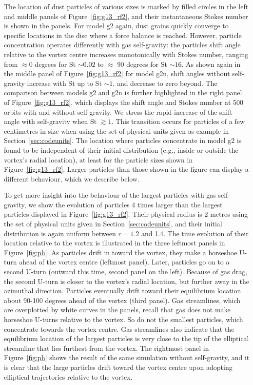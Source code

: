 \documentclass[a4paper,usenatbib]{mnras}
\begin{document}
The location of dust particles of various sizes is marked by filled
circles in the left and middle panels of Figure~\ref{fig:g13_rf2}, and
their instantaneous Stokes number is shown in the panels. For model g2
again, dust grains quickly converge to specific locations in the disc
where a force balance is reached. However, particle concentration
operates differently with gas self-gravity: the particles shift angle
relative to the vortex centre increases monotonically with Stokes
number, ranging from $\approx 0$ degrees for St $\sim 0.02$ to
$\approx$ 90 degrees for St $\sim 16$. As shown again in the middle
panel of Figure~\ref{fig:g13_rf2} for model g2n, shift angles without
self-gravity increase with St up to St $\sim 1$, and decrease to zero
beyond.  The comparison between models g2 and g2n is further
highlighted in the right panel of Figure~\ref{fig:g13_rf2}, which
displays the shift angle and Stokes number at 500 orbits with and
without self-gravity.  We stress the rapid increase of the shift angle
with self-gravity when St $\gtrsim 1$. This transition occurs for
particles of a few centimetres in size when using the set of physical
units given as example in Section~\ref{sec:codeunits}. The location
where particles concentrate in model g2 is found to be independent of
their initial distribution (e.g., inside or outside the vortex's
radial location), at least for the particle sizes shown in
Figure~\ref{fig:g13_rf2}. Larger particles than those shown in the
figure can display a different behaviour, which we describe below.

To get more insight into the behaviour of the largest particles with
gas self-gravity, we show the evolution of particles 4 times larger
than the largest particles displayed in Figure~\ref{fig:g13_rf2}.
Their physical radius is 2 metres using the set of physical units
given in Section~\ref{sec:codeunits}, and their initial distribution
is again uniform between $r=1.2$ and 1.4. The time evolution of their
location relative to the vortex is illustrated in the three leftmost
panels in Figure~\ref{fig:ph}. As particles drift in toward the
vortex, they make a horseshoe U-turn ahead of the vortex centre
(leftmost panel).  Later, particles go on to a second U-turn (outward
this time, second panel on the left). Because of gas drag, the second
U-turn is closer to the vortex's radial location, but further away in
the azimuthal direction. Particles eventually drift toward their
equilibrium location about 90-100 degrees ahead of the vortex (third
panel). Gas streamlines, which are overplotted by white curves in the
panels, recall that gas does not make horseshoe U-turns relative to
the vortex. So do not the smallest particles, which concentrate
towards the vortex centre. Gas streamlines also indicate that the
equilibrium location of the largest particles is very close to the tip
of the elliptical streamline that lies furthest from the vortex. The
rightmost panel in Figure~\ref{fig:ph} shows the result of the same
simulation without self-gravity, and it is clear that the large
particles drift toward the vortex centre upon adopting elliptical
trajectories relative to the vortex.
\end{document}
